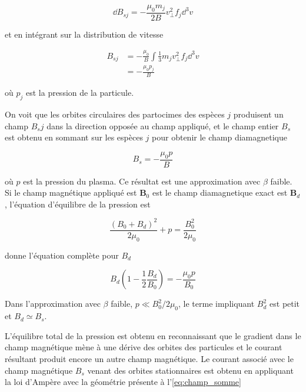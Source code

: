\documentclass[main.tex]{subfiles}
\begin{document}
\begin{equation}
	\dd B_{sj} = - \frac{\mu_0 m_j}{2 B} v_\perp^2 f_j \dd^3 v
	\label{eq:champ_magnetique_resultant}
\end{equation}

\nit et en intégrant sur la distribution de vitesse

\begin{align}
	B_{sj} &= - \frac{\mu_0}{B} \int \frac{1}{3} m_j v_\perp^2 f_j \dd^3 v\\
	& = - \frac{\mu_0 p_j}{B}
	\label{eq:champ_resultant_integre}
\end{align}

\nit où \( p_j \) est la pression de la particule.

On voit que les orbites circulaires des partocimes des espèces \( j \) produisent un champ \( B_sj \) dans la direction opposée au champ appliqué, et le champ entier \( B_s \) est obtenu en sommant sur les espèces \( j \) pour obtenir le champ diamagnetique

\begin{equation}
	B_s = - \frac{\mu_0 p}{B}
	\label{eq:champ_somme}
\end{equation}

\nit où \( p \) est la pression du plasma.
Ce résultat est une approximation avec \( \beta \) faible.
Si le champ magnétique appliqué est \( \bm{B}_0 \) est le champ diamagnetique exact est \( \bm{B}_d \), l'équation d'équilibre de la pression est

\[
	\frac{\left( B_0 +  B_d\right)^2}{2 \mu_0} + p = \frac{B_0^2}{2 \mu_0}
\]

\nit donne l'équation complète pour \( B_d \)

\begin{equation}
	B_d \left( 1 - \frac{1}{2} \frac{B_d}{B_0} \right) = - \frac{\mu_0 p}{B_0}
	\label{eq:Bd_complet}
\end{equation}

\nit Dans l'approximation avec \( \beta \) faible, \( p \ll B_0^2 / 2 \mu_0 \), le terme impliquant \( B_d^2 \) est petit et \( B_d \simeq B_s \).

L'équilibre total de la pression est obtenu en reconnaissant que le gradient dans le champ magnétique mène à une dérive des orbites des particules et le courant résultant produit encore un autre champ magnétique.
Le courant associé avec le champ magnétique \( B_s \) venant des orbites stationnaires est obtenu en appliquant la loi d'Ampère avec la géométrie présente à l'\autoref{eq:champ_somme}
\end{document}
